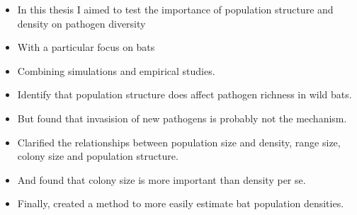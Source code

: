 

\begin{itemize}
\item In this thesis I aimed to test the importance of population structure and density on pathogen diversity
\item With a particular focus on bats
\item Combining simulations and empirical studies.
\item Identify that population structure does affect pathogen richness in wild bats.
\item But found that invasision of new pathogens is probably not the mechanism.  
\item Clarified the relationships between population size and density, range size, colony size and population structure.
\item And found that colony size is more important than density per se. 
\item Finally, created a method to more easily estimate bat population densities.
\end{itemize}




